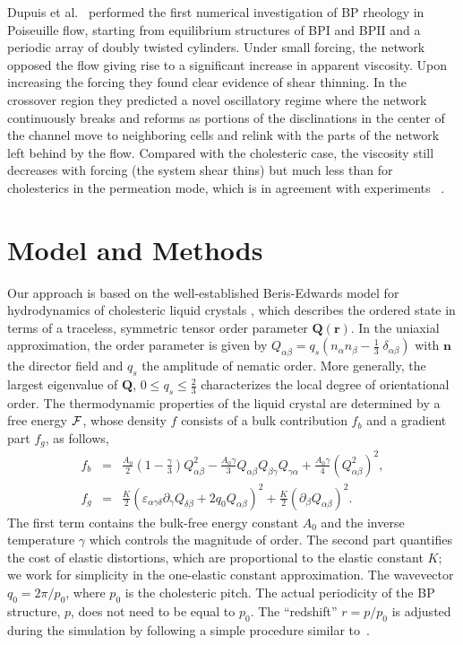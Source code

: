 \documentclass[aps,pre,reprint,superscriptaddress]{revtex4}
\begin{document}
Dupuis et al.~\cite{Dupuis:2005} performed the first numerical investigation of BP rheology 
in Poiseuille flow, starting from equilibrium structures of BPI and BPII and a periodic 
array of doubly twisted cylinders.
Under small forcing, the network opposed the flow giving rise to a significant 
increase in apparent viscosity.
Upon increasing the forcing they found clear evidence of shear thinning.
In the crossover region they predicted a novel oscillatory regime where the network 
continuously breaks and reforms as portions of the disclinations in the center of the channel 
move to neighboring cells and relink with the parts of the network left behind by the flow. 
Compared with the cholesteric case, the viscosity still decreases with forcing 
(the system shear thins) but much less than
for cholesterics in the permeation mode, which is in agreement with experiments
~\cite{Zapotocky:1999, Ramos:2002}.

\section{Model and Methods}

Our approach is based on the well-established Beris-Edwards model for hydrodynamics of
cholesteric liquid crystals \cite{Beris:1994}, which describes the ordered state 
in terms of a traceless, symmetric tensor order parameter ${\mathbf Q}({\mathbf r})$. 
In the uniaxial approximation, the order parameter is given by
$Q_{\alpha \beta}= q_s ( n_\alpha n_\beta - \frac{1}{3}\; \delta_{\alpha\beta})$
with ${\mathbf n}$ the director field and $q_s$ the amplitude of nematic
order. More generally,
the largest eigenvalue of ${\mathbf Q}$, $0\le q_s\le\frac{2}{3}$
characterizes the local degree of orientational order.
The thermodynamic properties of the liquid crystal are determined by a free energy
${\cal F}$, whose density $f$ consists of a bulk contribution $f_b$ and a gradient part $f_g$, as follows,
\begin{eqnarray}
f_b&=&\frac{A_0}{2}\left(1-\frac{\gamma}{3}\right) Q_{\alpha \beta}^2-\frac{A_0 \gamma}{3}Q_{\alpha \beta} Q_{\beta \gamma} Q_{\gamma \alpha}+\frac{A_0 \gamma}{4}(Q_{\alpha \beta}^2)^2,\nonumber\\
f_g&=&\frac{K}{2}(\varepsilon_{\alpha\gamma\delta} \partial_\gamma Q_{\delta\beta}+2 q_0 Q_{\alpha \beta})^2+\frac{K}{2}(\partial_\beta Q_{\alpha \beta})^2.\label{FE}
\end{eqnarray}
The first term contains the bulk-free energy constant $A_0$ and the inverse temperature $\gamma$ which controls the magnitude of order.
The second part quantifies the cost of elastic distortions, which are proportional to the elastic constant $K$;
we work for simplicity in the one-elastic constant approximation. The wavevector $q_0=2\pi/p_0$, where $p_0$ is the cholesteric pitch.
The actual periodicity of the BP structure, $p$, does not need to be equal to $p_0$.
The ``redshift'' $r=p/p_0$ is adjusted during the simulation by following a simple procedure similar to~\cite{Alexander:2006}.
\end{document}
